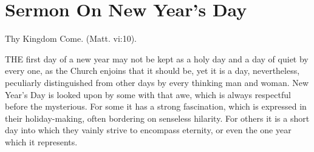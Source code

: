 \chapter{Sermon On New Year's Day}

Thy Kingdom Come. (Matt. vi:10).

THE first day of a new year may not be kept 
as a holy day and a day of quiet by every 
one, as the Church enjoins that it should be, yet 
it is a day, nevertheless, peculiarly distinguished 
from other days by every thinking man and 
woman. New Year's Day is looked upon by 
some with that awe, which is always respectful 
before the mysterious. For some it has a 
strong fascination, which is expressed in their 
holiday-making, often bordering on senseless 
hilarity. For others it is a short day into 
which they vainly strive to encompass eternity, 
or even the one year which it represents. 

